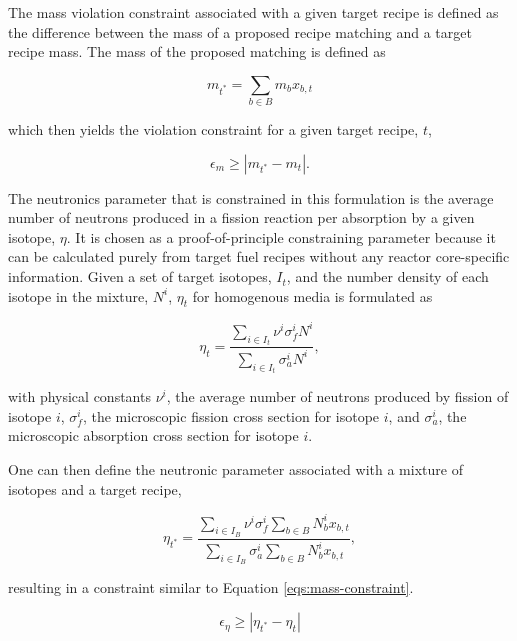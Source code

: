 The mass violation constraint associated with a given target recipe is defined
as the difference between the mass of a proposed recipe matching and a target
recipe mass. The mass of the proposed matching is defined as

\begin{equation}\label{eqs:mass-constraint}
m_{t^*} = \sum_{b \in B} m_{b} x_{b,t}
\end{equation}

which then yields the violation constraint for a given target recipe, $t$,

\begin{equation}\label{eqs:mass-constraint-simple}
\epsilon_{m} \geq \left| m_{t^*} - m_{t} \right|.
\end{equation}

The neutronics parameter that is constrained in this formulation is the average
number of neutrons produced in a fission reaction per absorption by a given
isotope, $\eta$. It is chosen as a proof-of-principle constraining parameter
because it can be calculated purely from target fuel recipes without any reactor
core-specific information. Given a set of target isotopes, $I_t$, and the number
density of each isotope in the mixture, $N^i$, $\eta_t$ for homogenous media is
formulated as

\begin{equation}
\label{eqs:eta_micro}
\eta_t = \frac{\sum_{i \in I_t} \nu^{i} \sigma_{f}^{i} N^{i}}
            {\sum_{i \in I_t} \sigma_{a}^{i} N^{i}},
\end{equation}

with physical constants $\nu^{i}$, the average number of neutrons produced by
fission of isotope $i$, $\sigma_{f}^{i}$, the microscopic fission cross section
for isotope $i$, and $\sigma_{a}^{i}$, the microscopic absorption cross section
for isotope $i$.

One can then define the neutronic parameter associated with a mixture of
isotopes and a target recipe,

\begin{equation}
\label{eqs:eta_fractions_nonlin}
\eta_{t^*} = \frac{\sum_{i \in I_{B}} \nu^{i} \sigma_{f}^{i} \sum_{b \in B} N_{b}^{i} x_{b,t}}
                {\sum_{i \in I_{B}} \sigma_{a}^{i} \sum_{b \in B} N_{b}^{i} x_{b,t}},
\end{equation}

resulting in a constraint similar to Equation \ref{eqs:mass-constraint}.

\begin{equation}\label{eqs:eta-constraint-nonlin}
\epsilon_{\eta} \geq \left| \eta_{t^*} - \eta_t \right|
\end{equation}

